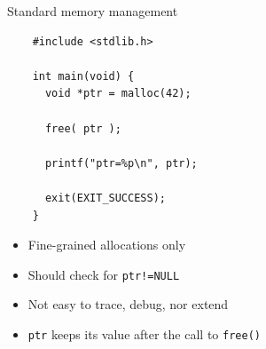 \begin{frame}[fragile]{Standard memory management}

  \begin{lstlisting}
    #include <stdlib.h>
    
    int main(void) {
      void *ptr = malloc(42);
      
      free( ptr );
      
      printf("ptr=%p\n", ptr);
      
      exit(EXIT_SUCCESS);
    }
  \end{lstlisting}
  
  \begin{itemize}
  \item Fine-grained allocations only
  \item Should check for \lstinline{ptr!=NULL}
  \item Not easy to trace, debug, nor extend
  \item \lstinline{ptr} keeps its value after the call to \lstinline{free()}
  \end{itemize}
  
\end{frame}


